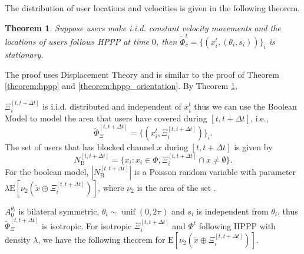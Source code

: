 \documentclass[10pt, conference, letterpaper]{IEEEtran}
\newtheorem{theorem}{Theorem}
\DeclareMathOperator*{\unif}{unif}
\begin{document}
The distribution of user locations and velocities is given in the following theorem.
\begin{theorem}\label{theorem:boolean_stationary}
Suppose users make i.i.d. constant velocity movements and the locations of users follows HPPP at time $0$, then $\tilde{\Phi}_c^t = \{(x_i^t, (\theta_i, s_i))\}_i$ is stationary.
\end{theorem}
The proof uses Displacement Theory and is similar to the proof of Theorem \ref{theorem:hppp} and \ref{theorem:hppp_orientation}.
By Theorem \ref{theorem:boolean_stationary}, 

$\Xi_i^{[t, t+\Delta t]}$ is i.i.d. distributed and independent of $x_i^t$ thus we can use the Boolean Model \cite{stochasticgeometry} to model the area that users have covered during $[t, t+\Delta t]$, i.e., 
\begin{equation*}
\tilde{\Phi}_{\Xi}^{[t, t+\Delta t]} = \{(x_i^t, \Xi_i^{[t, t+\Delta t]})\}_i.
\end{equation*}
The set of users that has blocked channel $x$ during $[t, t+\Delta t]$ is given by
\begin{equation*}
N_{\mathrm{B}}^{[t, t + \Delta t]} = \{x_i:x_i \in \Phi, \Xi_i^{[t, t+\Delta t]}\cap x \neq \emptyset \}.
\end{equation*}
For the boolean model, $|N_{\mathrm{B}}^{[t, t + \Delta t]}|$ is a Poisson random variable with parameter $\lambda\mathrm{E}[\nu_2(\check{x}\oplus \Xi_i^{[t, t+\Delta t]})]$, where $\nu_2$ is the area of the set \cite{stochasticgeometry}.

$A_0^{\theta_i}$ is bilateral symmetric, $\theta_i\sim\unif(0, 2\pi)$ and $s_i$ is independent from $\theta_i$, thus $\tilde{\Phi}_{\Xi}^{[t, t+\Delta t]}$ is isotropic. For isotropic $\Xi_i^{[t, t+\Delta t]}$ and $\Phi^t$ following HPPP with density $\lambda$, we have the following theorem for $\mathrm{E}[\nu_2(\check{x}\oplus\Xi_i^{[t, t+\Delta t]})]$.
\end{document}
